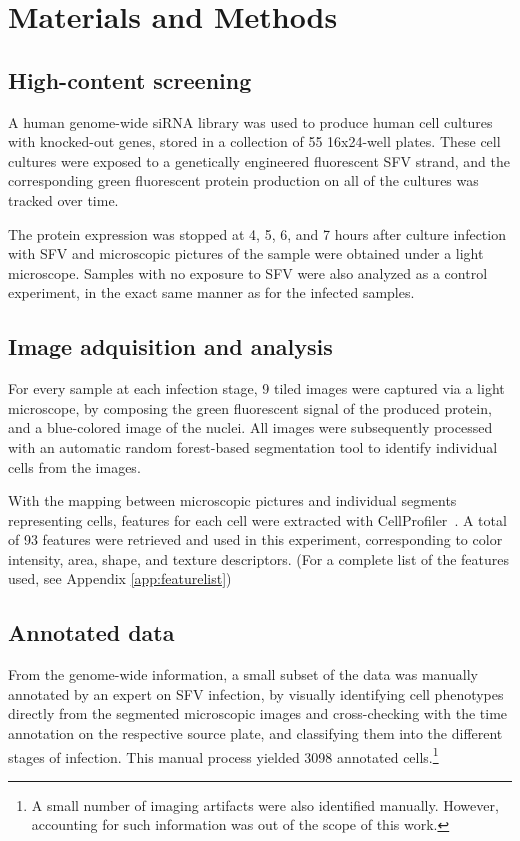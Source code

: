 \documentclass[oneside, a4paper, draft]{memoir} %
\begin{document}
\section{Materials and Methods}
\subsection{High-content screening}
A human genome-wide siRNA library was used to produce human cell cultures with knocked-out
genes, stored in a collection of 55 16x24-well plates.
These cell cultures were exposed to a genetically engineered fluorescent SFV strand, and the corresponding
green fluorescent protein production on all of the cultures was tracked over time.

The protein expression was stopped at 4, 5, 6, and 7 hours after culture infection with SFV and microscopic pictures
of the sample were obtained under a light microscope. Samples with no exposure to SFV were also analyzed as a control
experiment, in the exact same manner as for the infected samples.
\subsection{Image adquisition and analysis}
For every sample at each infection stage, 9 tiled images were captured via a light microscope, by composing the
green fluorescent signal of the produced protein, and a blue-colored image of the nuclei. All images were
subsequently processed with an automatic random forest-based segmentation 
tool to identify individual cells from the images.

With the mapping between microscopic pictures and individual segments representing cells, features for each cell were
extracted with CellProfiler~\cite{carpenter2006cellprofiler}.
A total of 93 features were retrieved and used in this experiment, corresponding to color intensity, area, shape, and texture descriptors.
(For a complete list of the features used, see Appendix \ref{app:featurelist})

\subsection{Annotated data}
From the genome-wide information, a small subset of the data was manually annotated by an expert on SFV infection, by visually identifying cell phenotypes
directly from the segmented microscopic images and cross-checking with the time annotation on the respective source plate,
and classifying them into the different stages of infection. This manual process yielded
3098 annotated cells.\footnote{A small number of imaging artifacts were also identified manually. However, accounting for such information was
out of the scope of this work.}
\end{document}
